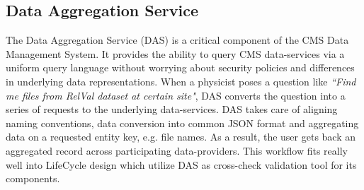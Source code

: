 \subsection{Data Aggregation Service}
The Data Aggregation Service (DAS) \cite{DAS} is a critical component of the CMS Data
Management System. It provides the ability to query CMS data-services via a uniform
query language without worrying about security policies and differences in
underlying data representations. When a physicist poses a question like {\it ``Find me files from RelVal dataset at certain site"}, DAS converts the question into a
series of requests to the underlying data-services. DAS takes care of aligning naming conventions, data conversion into common
JSON format and aggregating data on a requested entity key, e.g. file names.
As a result, the user gets back an aggregated record across participating
data-providers.  This workflow fits really well into LifeCycle design which
utilize DAS as cross-check validation tool for its components.

%
